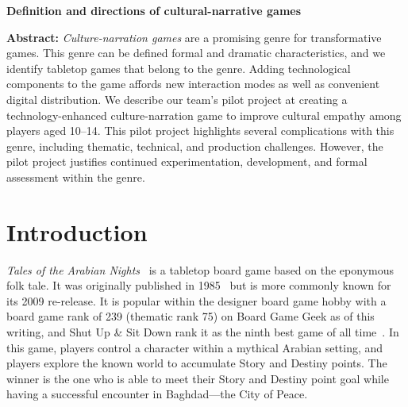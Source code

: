 \documentclass[a4paper]{article}
\newcommand{\projecttitle}{Definition and directions of cultural-narrative games}
\begin{document}
\begin{center}
\fontsize{14}{16.8}\selectfont
\bf \projecttitle
\end{center}

\vspace{-0.25in}
\begin{center}
\iftoggle{blind}{
}{
Paul Gestwicki, others, Ball State University\\
pvgestwicki@bsu.edu\\
}
\end{center}

\newcommand{\totan}{\textit{TotAN}}
\newcommand{\smersh}{\textit{SMERSH}}

%
\begin{adjustwidth}{0.5in}{0.5in}
  \textbf{Abstract:} \textit{Culture-narration games} are a promising
  genre for transformative games. This genre can be defined formal and
  dramatic characteristics, and we identify tabletop games that belong
  to the genre.  Adding technological components to the game affords
  new interaction modes as well as convenient digital distribution. We
  describe our team's pilot project at creating a technology-enhanced
  culture-narration game to improve cultural empathy among players aged
  10--14.  This pilot project highlights several complications with
  this genre, including thematic, technical, and production
  challenges.  However, the pilot project justifies continued
  experimentation, development, and formal assessment within the
  genre.
\end{adjustwidth}

\section{Introduction}

\textit{Tales of the Arabian Nights}~\citep{Goldberg2009} is a 
tabletop board game based on the eponymous folk tale.
It was originally published in 1985~\citep{Goldberg1985} but is more commonly
known for its 2009 re-release. 
It is popular within the designer board game hobby with a board game
rank of 239 (thematic rank 75) on Board Game Geek as of this writing,
and Shut Up \& Sit Down rank it as the ninth best game of all 
time~\citep{ShutUp2015}.
In this game, players control a character within a mythical Arabian
setting, and players explore the known world to accumulate Story and
Destiny points. The winner is the one who is able to meet their 
Story and Destiny point goal while having a successful encounter
in Baghdad---the City of Peace.
\end{document}
